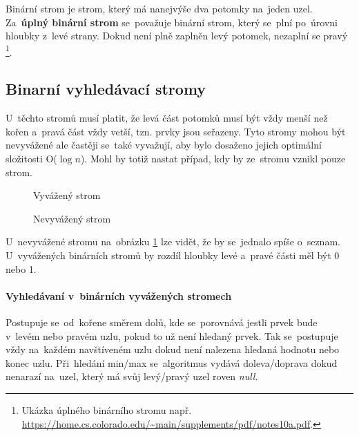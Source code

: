 Binární strom je strom, který má nanejvýše dva potomky na~jeden uzel. Za~\textbf{úplný binární strom} se~považuje binární strom, který se~plní po~úrovni hloubky z~levé strany. Dokud není plně zaplněn levý potomek, nezaplní se pravý%
\footnote{Ukázka úplného binárního stromu např. \url{https://home.cs.colorado.edu/~main/supplements/pdf/notes10a.pdf}.}.

\subsection{Binarní vyhledávací stromy}

U~těchto stromů musí platit, že levá část potomků musí být vždy menší než kořen a~pravá část vždy vetší, tzn. prvky jsou seřazeny. Tyto stromy mohou být nevyvážené ale častěji se~také vyvažují, aby bylo dosaženo jejich optimální složitosti O($\log{n}$). Mohl by totiž nastat případ, kdy by ze~stromu vznikl pouze strom.

\begin{figure}[ht]
	\begin{minipage}[b]{0.47\textwidth}
		\centering
		\caption{Vyvážený strom}
		\label{even_binary_tree}
 	\end{minipage}
	\hspace*{1em}%
 	\begin{minipage}[b]{0.47\textwidth}
 		\centering
		\caption{Nevyvážený strom}
		\label{noneven_binary_tree}
	\end{minipage}
\end{figure}

U~nevyvážené stromu na~obrázku \ref{noneven_binary_tree} lze vidět, že by se~jednalo spíše o~seznam. U~vyvážených binárních stromů by rozdíl hloubky levé a~pravé části měl být 0 nebo 1.

\paragraph{Vyhledávaní v~binárních vyvážených stromech} Postupuje se~od~kořene směrem dolů, kde se~porovnává jestli prvek bude v~levém nebo pravém uzlu, pokud to už není hledaný prvek. Tak se~postupuje vždy na~každém navštíveném uzlu dokud není nalezena hledaná hodnotu nebo konec uzlu. Při~hledání min/max se~algoritmus vydává doleva/doprava dokud nenarazí na~uzel, který má svůj levý/pravý uzel roven \emph{null}.

